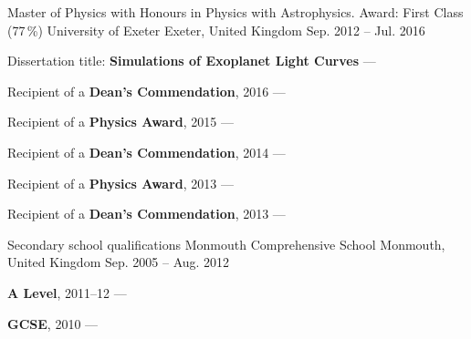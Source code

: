 \begin{cventries}
    \cventry
        {Master of Physics with Honours in Physics with Astrophysics. Award: First Class (77\,\%)} %
        {University of Exeter} %
        {Exeter, United Kingdom} %
        {Sep. 2012 -- Jul. 2016} %
        {
        \begin{cvitems} %
            \item {Dissertation title: \textbf{Simulations of Exoplanet Light Curves} --- }
            \vpaddingEdu
            \item {Recipient of a \textbf{Dean's Commendation}, 2016 --- }
            \vpaddingEdu
            \item {Recipient of a \textbf{Physics Award}, 2015 --- }
            \vpaddingEdu
            \item {Recipient of a \textbf{Dean's Commendation}, 2014 --- }
            \vpaddingEdu
            \item {Recipient of a \textbf{Physics Award}, 2013 --- }
            \vpaddingEdu
            \item {Recipient of a \textbf{Dean's Commendation}, 2013 --- }
        \end{cvitems}
        }

    \cventry
        {Secondary school qualifications}
        {Monmouth Comprehensive School}
        {Monmouth, United Kingdom}
        {Sep. 2005 -- Aug. 2012}
        {
        \begin{cvitems}
            \item {\textbf{A Level}, 2011--12 --- }
            \vpaddingEdu
            \item {\textbf{GCSE}, 2010 --- }
        \end{cvitems}
        }
\end{cventries}
